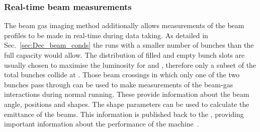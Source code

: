 \subsubsection{Real-time beam measurements}
The beam gas imaging method additionally allows measurements of the beam profiles to be made in real-time during data taking. 
As detailed in Sec.~\ref{sec:Dec_beam_conds} the \lhc runs with a smaller number of bunches than the full capacity would allow. The distribution of filled and empty bunch slots are usually chosen to maximise the luminosity for \atlas and \cms, therefore only a subset of the total bunches collide at \lhcb. Those beam crossings in which only one of the two bunches pass through \lhcb can be used to make measurements of the beam-gas interactions during normal running.
These provide information about the beam angle, positions and shapes. The shape parameters can be used to calculate the emittance of the beams. This information is published back to the \lhc, providing important information about the performance of the machine~\cite{Hadavizadeh:IPAC2017-MOPAB131}.





